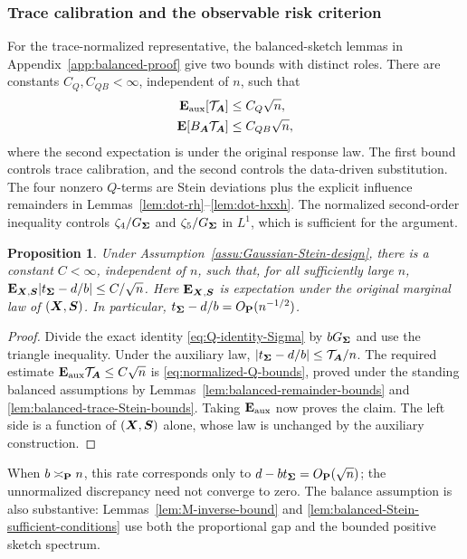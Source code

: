 \documentclass{article}
\theoremstyle{plain} %
\newtheorem{proposition}[theorem]{Proposition}
\theoremstyle{definition} %
\theoremstyle{definition} %
\begin{document}
\subsubsection{Trace calibration and the observable risk criterion}
\label{app:proof-trace-calibration-general}

For the trace-normalized representative, the balanced-sketch lemmas in
Appendix~\ref{app:balanced-proof} give two bounds with distinct roles.
There are constants
$C_Q,C_{QB}<\infty$, independent of $n$, such that
\begin{align}
    \E_{\rm aux}[\mathcal T_{\bA}]&\leq C_Q\sqrt n,
    \label{eq:normalized-Q-bounds}\\
    \E[B_{\bA}\mathcal T_{\bA}]&\leq C_{QB}\sqrt n,
    \label{eq:weighted-Q-bounds}
\end{align}
where the second expectation is under the original response law. The first
bound controls trace calibration, and the second controls the data-driven
substitution. The four nonzero $Q$-terms are
Stein deviations plus the explicit influence remainders in
Lemmas~\ref{lem:dot-rh}--\ref{lem:dot-hxxh}. The normalized second-order inequality
controls $\zeta_4/G_{\bSigma}$ and $\zeta_5/G_{\bSigma}$ in $L^1$,
which is sufficient for the argument.

\begin{proposition}
\label{prop:trace-calibration-general}
Under Assumption~\ref{assu:Gaussian-Stein-design}, there is a constant
$C<\infty$, independent of $n$, such that, for all sufficiently large $n$,
$\E_{\bX,\bS}|t_{\bSigma}-d/b|\leq C/\sqrt n$.
Here $\E_{\bX,\bS}$ is expectation under the original marginal law of
$(\bX,\bS)$.  In particular,
$t_{\bSigma}-d/b=O_{\P}(n^{-1/2})$.
\end{proposition}

\begin{proof}
Divide the exact identity \eqref{eq:Q-identity-Sigma} by $bG_{\bSigma}$ and
use the triangle inequality.  Under the auxiliary law,
$|t_{\bSigma}-d/b|\leq \mathcal T_{\bA}/n$.
The required estimate
$\E_{\rm aux}\mathcal T_{\bA}\leq C\sqrt n$ is
\eqref{eq:normalized-Q-bounds}, proved under the standing balanced
assumptions by Lemmas~\ref{lem:balanced-remainder-bounds} and
\ref{lem:balanced-trace-Stein-bounds}.  Taking $\E_{\rm aux}$ now proves the
claim.  The left side is a function of $(\bX,\bS)$ alone, whose law is
unchanged by the auxiliary construction.
\end{proof}

When $b\asymp_{\P}n$, this rate corresponds only to
$d-bt_{\bSigma}=O_{\P}(\sqrt n)$; the unnormalized discrepancy need not
converge to zero.  The balance assumption is also substantive:
Lemmas~\ref{lem:M-inverse-bound} and
\ref{lem:balanced-Stein-sufficient-conditions} use both the proportional gap
and the bounded positive sketch spectrum.
\end{document}
